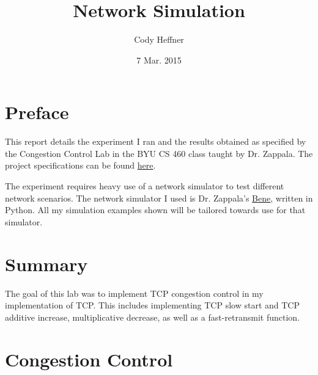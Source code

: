 \documentclass[11pt]{article}
\begin{document}
\lstset{
  language=Python,
  basicstyle=\small,          %
  keywordstyle=\bfseries,
  identifierstyle=,           %
  commentstyle=,              %
  stringstyle=\ttfamily,      %
  showstringspaces=false,     %
  numbers=left,
  numberstyle=\tiny,
  numbersep=5pt,
  frame=tb,
}

\newenvironment{absolutelynopagebreak}
  {\par\nobreak\vfil\penalty0\vfilneg
   \vtop\bgroup}
  {\par\xdef\tpd{\the\prevdepth}\egroup
   \prevdepth=\tpd}

\title{Network Simulation}

\author{Cody Heffner}

\date{7 Mar. 2015}

\maketitle

\section{Preface}

This report details the experiment I ran and the results obtained as specified by the Congestion Control Lab in the BYU CS 460 class taught by Dr. Zappala. The project specifications can be found \href{http://cs460.byu.edu/winter-2015/labs/congestion-control-part-1}{here}.

The experiment requires heavy use of a network simulator to test different network scenarios. The network simulator I used is Dr. Zappala's \href{https://github.com/zappala/bene}{Bene}, written in Python. All my simulation examples shown will be tailored towards use for that simulator.

\section{Summary}

The goal of this lab was to implement TCP congestion control in my implementation of TCP. This includes implementing TCP slow start and TCP additive increase, multiplicative decrease, as well as a fast-retransmit function.

\section{Congestion Control}
\end{document}
